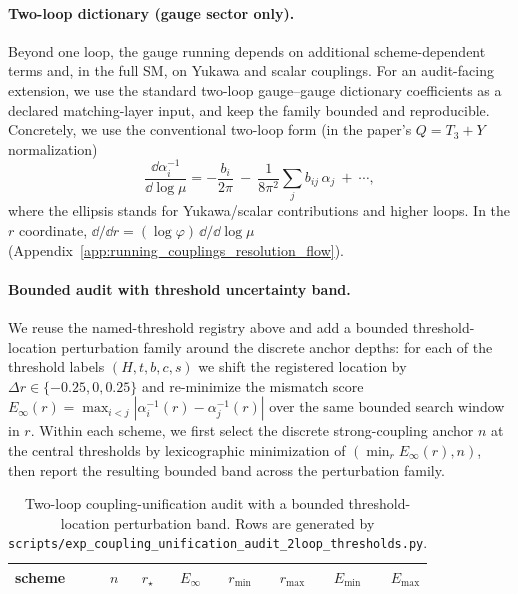 \paragraph{Two-loop dictionary (gauge sector only).}
\MatchTag Beyond one loop, the gauge running depends on additional scheme-dependent terms and, in the full SM, on Yukawa and scalar couplings.
For an audit-facing extension, we use the standard two-loop gauge--gauge dictionary coefficients as a declared matching-layer input, and keep the family bounded and reproducible.
Concretely, we use the conventional two-loop form (in the paper's $Q=T_3+Y$ normalization)
\[
\frac{\dd \alpha_i^{-1}}{\dd\log\mu}
=-\frac{b_i}{2\pi}\ -\ \frac{1}{8\pi^2}\sum_{j} b_{ij}\,\alpha_j\ +\ \cdots,
\]
where the ellipsis stands for Yukawa/scalar contributions and higher loops.
In the $r$ coordinate, $\dd/\dd r=(\log\varphi)\,\dd/\dd\log\mu$ (Appendix~\ref{app:running_couplings_resolution_flow}).

\paragraph{Bounded audit with threshold uncertainty band.}
\AuditTag We reuse the named-threshold registry above and add a bounded threshold-location perturbation family around the discrete anchor depths:
for each of the threshold labels $(H,t,b,c,s)$ we shift the registered location by $\Delta r\in\{-0.25,0,0.25\}$ and re-minimize the mismatch score
$
E_\infty(r)=\max_{i<j}|\alpha_i^{-1}(r)-\alpha_j^{-1}(r)|
$
over the same bounded search window in $r$.
Within each scheme, we first select the discrete strong-coupling anchor $n$ at the central thresholds by lexicographic minimization of $(\min_r E_\infty(r),n)$, then report the resulting bounded band across the perturbation family.

%

\begin{table}[H]
\centering
\small
\setlength{\tabcolsep}{8pt}
\renewcommand{\arraystretch}{1.15}
\begin{tabular}{lrrrrrrr}
\toprule
scheme & $n$ & $r_\star$ & $E_\infty$ & $r_{\min}$ & $r_{\max}$ & $E_{\min}$ & $E_{\max}$ \\
\midrule
%
\end{tabular}
\caption{Two-loop coupling-unification audit with a bounded threshold-location perturbation band. Rows are generated by \texttt{scripts/exp\_coupling\_unification\_audit\_2loop\_thresholds.py}.}
\label{tab:coupling_unification_2loop_threshold_audit}
\end{table}

